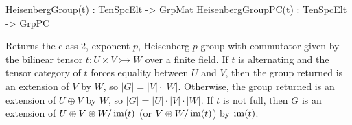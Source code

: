 \begin{intrinsics}
HeisenbergGroup(t) : TenSpcElt -> GrpMat
HeisenbergGroupPC(t) : TenSpcElt -> GrpPC
\end{intrinsics}

Returns the class 2, exponent $p$, Heisenberg $p$-group with commutator given by
the bilinear tensor $t: U \times V \rightarrowtail W$ over a finite field. If
$t$ is alternating and the tensor category of $t$ forces equality between $U$
and $V$, then the group returned is an extension of $V$ by $W$, so $|G| =
|V|\cdot |W|$. Otherwise, the group returned is an extension of $U\oplus V$ by
$W$, so $|G| = |U|\cdot |V| \cdot |W|$. If $t$ is not full, then $G$ is an
extension of $U\oplus V\oplus W/\operatorname{im}(t)$ (or $V\oplus W/\operatorname{im}(t)$) by $\operatorname{im}(t)$. 

